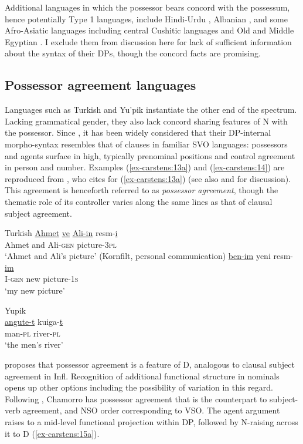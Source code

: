\documentclass[output=paper
,modfonts
,nonflat]{langsci/langscibook}
\begin{document}
\noindent Additional languages in which the possessor bears concord with the possessum, hence potentially Type 1 languages, include Hindi-Urdu \citep{Bogel_Butt2013}, Albanian \citep{Spencer2007}, and some Afro-Asiatic languages including central Cushitic languages \citep{Hetzron1995} and Old and Middle Egyptian \citep{Haspelmath2015}. I exclude them from discussion here for lack of sufficient information about the syntax of their DPs, though the concord facts are promising.

\subsection{Possessor agreement languages} \label{sec-carstens:2.2}
Languages such as Turkish and Yu'pik instantiate the other end of the spectrum. Lacking grammatical gender, they also lack concord sharing features of N with the possessor. Since \citet{Abney1987}, it has been widely considered that their DP-internal morpho-syntax resembles that of clauses in familiar SVO languages: possessors and agents surface in high, typically prenominal positions and control agreement in person and number. Examples (\ref{ex-carstens:13a}) and (\ref{ex-carstens:14}) are reproduced from \citet{Abney1987}, who cites \citet{Underhill1976} for (\ref{ex-carstens:13a}) (see also \citealt{Gavruseva2000} and \citealt{Haegeman2004} for discussion). This agreement is henceforth referred to as \textit{possessor agreement}, though the thematic role of its controller varies along the same lines as that of clausal subject agreement. 

\begin{exe}
	\ex Turkish \label{ex-carstens:13}
	\xlist
	\ex \label{ex-carstens:13a}
	\gll \uline{Ahmet} \uline{ve} \uline{Ali-in}     resm-\uline{i}  \\
	Ahmet and Ali-\textsc{gen}   picture-3\textsc{pl}\\
	\glt `Ahmet and Ali's picture'  	
	\ex (Kornfilt, personal communication)\label{ex-carstens:13b}\newline
	\gll \uline{ben-im}   yeni  resm-\uline{im}\\
	I-\textsc{gen}  new   picture-1\textsc{s}\\
	\glt `my new picture'
	\endxlist
\end{exe}

\begin{exe}
	\ex Yupik \label{ex-carstens:14}\\
	\gll \uline{angute-t}		kuiga-\uline{t}\\
	man-\textsc{pl}    river-\textsc{pl}\\
	\glt `the men's river'  	
\end{exe}
\citet{Abney1987} proposes that possessor agreement is a feature of D, analogous to clausal subject agreement in Infl. Recognition of additional functional structure in nominals opens up other options including the possibility of variation in this regard. Following \citet{Chung1982}, Chamorro has possessor agreement that is the counterpart to subject-verb agreement, and NSO order corresponding to VSO. The agent argument raises to a mid-level functional projection within DP, followed by N-raising across it to D (\ref{ex-carstens:15a}).
\end{document}
